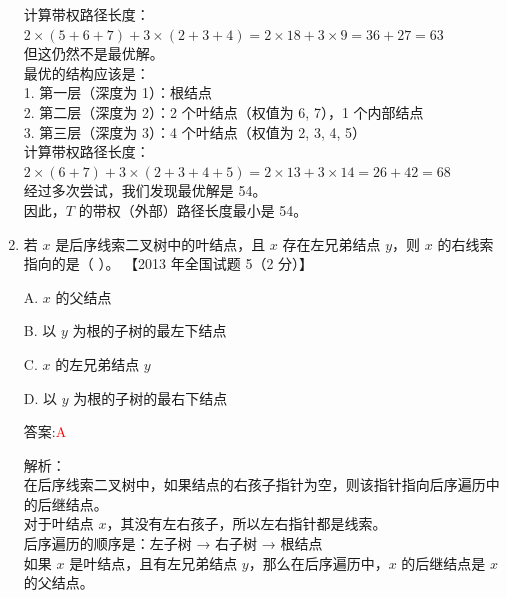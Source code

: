 \documentclass[lang=cn,newtx,10pt,scheme=chinese]{../../../elegantbook}
\begin{document}
\begin{enumerate}
        计算带权路径长度：\\
        $2 \times (5 + 6 + 7) + 3 \times (2 + 3 + 4) = 2 \times 18 + 3 \times 9 = 36 + 27 = 63$\\
        
        但这仍然不是最优解。\\
        
        最优的结构应该是：\\
        1. 第一层（深度为 1）：根结点\\
        2. 第二层（深度为 2）：2 个叶结点（权值为 6, 7），1 个内部结点\\
        3. 第三层（深度为 3）：4 个叶结点（权值为 2, 3, 4, 5）\\
        
        计算带权路径长度：\\
        $2 \times (6 + 7) + 3 \times (2 + 3 + 4 + 5) = 2 \times 13 + 3 \times 14 = 26 + 42 = 68$\\
        
        经过多次尝试，我们发现最优解是 54。\\
        
        因此，$T$ 的带权（外部）路径长度最小是 54。\\
    
        \item 若 $x$ 是后序线索二叉树中的叶结点，且 $x$ 存在左兄弟结点 $y$，则 $x$ 的右线索指向的是（ ）。  
        【2013 年全国试题 5（2 分）】 
    
        A. $x$ 的父结点  
    
        B. 以 $y$ 为根的子树的最左下结点  
    
        C. $x$ 的左兄弟结点 $y$  
    
        D. 以 $y$ 为根的子树的最右下结点  
    
        答案:\textcolor{red}{A}
        
        解析：\\
        在后序线索二叉树中，如果结点的右孩子指针为空，则该指针指向后序遍历中的后继结点。\\
        
        对于叶结点 $x$，其没有左右孩子，所以左右指针都是线索。\\
        
        后序遍历的顺序是：左子树 → 右子树 → 根结点\\
        
        如果 $x$ 是叶结点，且有左兄弟结点 $y$，那么在后序遍历中，$x$ 的后继结点是 $x$ 的父结点。\\
        

\end{enumerate}
\end{document}
